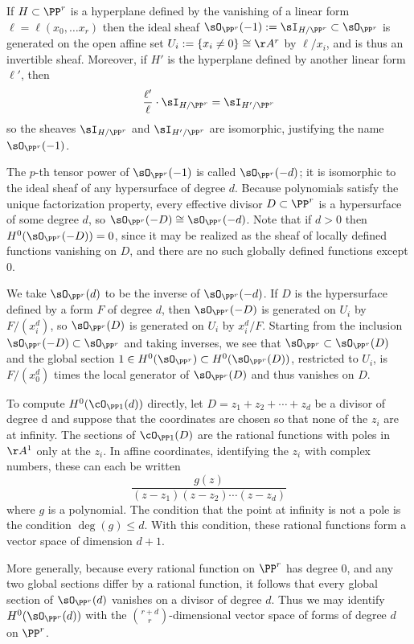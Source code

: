 \begin{example} \label{linear series on Pr} If $H\subset \PP^{r}$ is a hyperplane defined by the vanishing of a linear form $\ell = \ell(x_{0}, \dots x_{r})$ then the ideal sheaf $\sO_{\PP^{r}}(-1) := \sI_{H/\PP^{r}}\subset \sO_{\PP^{r}}$ is generated on the open affine set 
$U_{i}:= \{x_{i}\neq 0\} \cong \AA^{r}$
by $\ell/x_{i}$, and is thus an invertible sheaf. 
Moreover, if $H'$ is the hyperplane defined by another linear form $\ell'$, then 
$$
\frac{\ell'}{\ell}\cdot\sI_{H/\PP^{r}} = \sI_{H'/\PP^{r}} 
$$
so the sheaves $\sI_{H/\PP^{r}}$ and $\sI_{H'/\PP^{r}} $ are isomorphic, justifying the name $\sO_{\PP^{r}}(-1)$.

The $p$-th tensor power of $\sO_{\PP^{r}}(-1)$ is called $\sO_{\PP^{r}}(-d)$; it is isomorphic to the
ideal sheaf of any hypersurface of degree $d$. Because polynomials satisfy the unique factorization property,
every effective divisor $D\subset \PP^{r}$ is a hypersurface of some degree $d$, so
$\sO_{\PP^{r}}(-D) \cong \sO_{\PP^{r}}(-d)$. Note that if $d>0$ then $H^{0}(\sO_{\PP^{r}}(-D)) = 0$, since it may be realized
as the sheaf of locally defined functions vanishing on $D$, and there are no such
globally defined functions except 0.

We take $\sO_{\PP^{r}}(d)$ to be the inverse of $\sO_{\PP^{r}}(-d)$. If $D$ is the hypersurface defined by 
a form $F$ of degree $d$, then $\sO_{\PP^{r}}(-D)$ is generated on $U_{i}$ by $F/(x_{i}^{d})$, so
$\sO_{\PP^{r}}(D)$ is generated on $U_{i}$ by $x_{i}^{d}/F$.
Starting from the inclusion 
$
\sO_{\PP^{r}}(-D) \subset \sO_{\PP^{r}}
$
and taking inverses, we see that 
$
\sO_{\PP^{r}} \subset \sO_{\PP^{r}}(D)
$
and the global section $1\in H^0(\sO_{\PP^{r}})\subset H^0(\sO_{\PP^{r}}(D))$, restricted to
$U_{i}$, is $F/(x_{0}^{d})$ times the local generator of $\sO_{\PP^{r}}(D)$ and thus vanishes on $D$.
 
To compute $H^0(\cO_{\PP1} (d))$ directly, let $D = z_1 +z_2 +\cdots+z_d$ be a divisor of degree d and suppose that the coordinates are chosen so that none of the $z_i$ are at infinity. The sections of $\cO_{\PP1} (D)$ are the rational functions with poles in $\AA^1$ only at 
the $z_i$. In affine coordinates, identifying the $z_i$ with complex numbers, these can each be written
$$
\frac{g(z)}{(z-z_1)(z-z_2)\cdots(z-z_d)}
$$
where $g$ is a polynomial. The condition that the point at infinity is not a pole is the condition $\deg(g) \leq d$. With this condition, these rational functions form a vector space of dimension $d+1$.

More generally, because every
rational function on $\PP^{r}$ has degree 0, and any two global sections differ by a rational
function, it follows that every global section of $\sO_{\PP^{r}}(d)$ vanishes on a divisor of degree $d$. Thus
we may identify $H^{0}(\sO_{\PP^{r}}(d))$ with the ${r+d\choose r}$-dimensional vector space of forms of degree $d$ on $\PP^{r}$.
\end{example}


